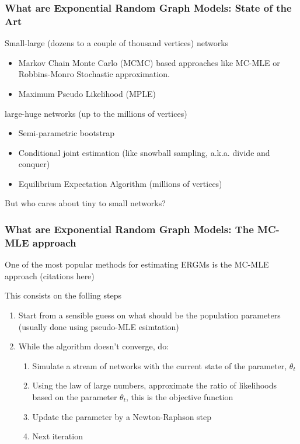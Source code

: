 \documentclass[aspectratio=169, 10pt]{beamer}
\begin{document}
\begin{frame}
\frametitle{What are Exponential Random Graph Models: State of the Art}
\pause
Small-large (dozens to a couple of thousand vertices) networks

\begin{itemize}
\item Markov Chain Monte Carlo (MCMC) based approaches like MC-MLE or Robbins-Monro Stochastic approximation.
\item Maximum Pseudo Likelihood (MPLE)
\end{itemize}\pause

large-huge networks (up to the millions of vertices)

\begin{itemize}
\item Semi-parametric bootstrap
\item Conditional joint estimation (like snowball sampling, a.k.a. divide and conquer)
\item Equilibrium Expectation Algorithm (millions of vertices)
\end{itemize}\pause

But who cares about tiny to small networks?

\end{frame}

\begin{frame}
\frametitle{What are Exponential Random Graph Models: The MC-MLE approach}

One of the most popular methods for estimating ERGMs is the MC-MLE approach (citations here)

This consists on the folling steps

\begin{enumerate}
\item Start from a sensible guess on what should be the population parameters
(usually done using pseudo-MLE esimtation)
\item While the algorithm doesn't converge, do:
  \begin{enumerate}
  \item Simulate a stream of networks with the current state of the parameter,
  $\theta_t$
  \item Using the law of large numbers, approximate the ratio of likelihoods 
  based on the parameter $\theta_t$, this is the objective function
  \item Update the parameter by a Newton-Raphson step
  \item Next iteration
  \end{enumerate}
\end{enumerate}

\end{frame}
\end{document}
